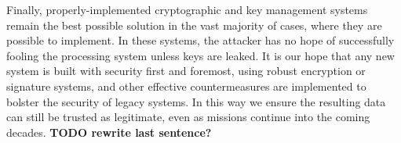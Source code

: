 Finally, properly-implemented cryptographic and key management systems remain the best possible solution in the vast majority of cases, where they are possible to implement.
In these systems, the attacker has no hope of successfully fooling the processing system unless keys are leaked.
It is our hope that any new system is built with security first and foremost, using robust encryption or signature systems, and other effective countermeasures are implemented to bolster the security of legacy systems.
In this way we ensure the resulting data can still be trusted as legitimate, even as missions continue into the coming decades.
\textbf{TODO rewrite last sentence?}
